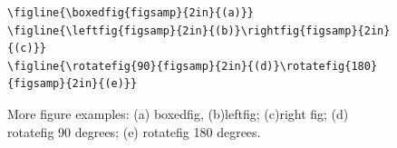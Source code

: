 \documentclass[reprint]{JASA}
\begin{document}
\begin{figure}
\baselineskip=12pt
\begin{verbatim}
\figline{\boxedfig{figsamp}{2in}{(a)}}
\figline{\leftfig{figsamp}{2in}{(b)}\rightfig{figsamp}{2in}{(c)}}
\figline{\rotatefig{90}{figsamp}{2in}{(d)}\rotatefig{180}{figsamp}{2in}{(e)}}
\end{verbatim}




\caption{More figure examples: (a) boxedfig, 
(b)leftfig; (c)right fig; (d) rotatefig 90 degrees;
(e) rotatefig 180 degrees. }

\end{figure}
\end{document}

